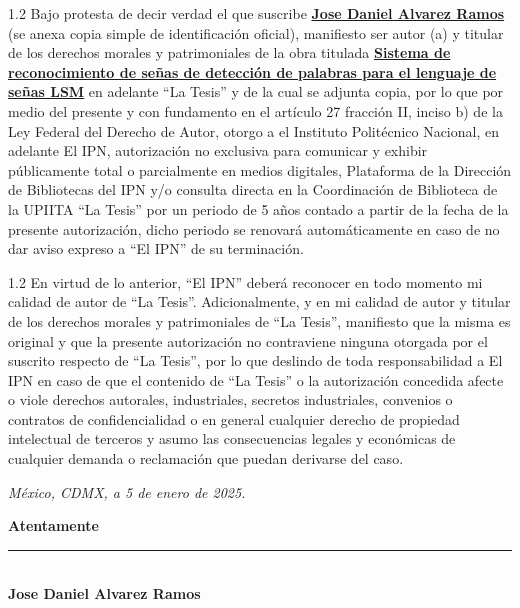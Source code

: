 \begin{spacing}{1.2}
    \noindent Bajo protesta de decir verdad el que suscribe \ul{\textbf{Jose Daniel Alvarez Ramos}} (se anexa copia simple de identificación oficial), manifiesto ser autor (a) y titular de los derechos morales y patrimoniales de la obra titulada \ul{\textbf{Sistema de reconocimiento de señas de detección de palabras
    para el lenguaje de señas LSM}} en adelante ``La Tesis'' y de la cual se adjunta copia, por lo que por medio del presente y con fundamento en el artículo 27 fracción II, inciso b) de la Ley Federal del Derecho de Autor, otorgo a el Instituto Politécnico Nacional, en adelante El IPN, autorización no exclusiva para comunicar y exhibir públicamente total o parcialmente en medios digitales, Plataforma de la Dirección de Bibliotecas del IPN y/o consulta directa en la Coordinación de Biblioteca de la UPIITA ``La Tesis'' por un periodo de 5 años contado a partir de la fecha de la presente autorización, dicho periodo se renovará automáticamente en caso de no dar aviso expreso a ``El IPN'' de su terminación.
\end{spacing}

\vspace{0.6cm}
\begin{spacing}{1.2}
\noindent En virtud de lo anterior, ``El IPN'' deberá reconocer en todo momento mi calidad de autor de ``La Tesis''. Adicionalmente, y en mi calidad de autor y titular de los derechos morales y patrimoniales de ``La Tesis'', manifiesto que la misma es original y que la presente autorización no contraviene ninguna otorgada por el suscrito respecto de ``La Tesis'', por lo que deslindo de toda responsabilidad a El IPN en caso de que el contenido de ``La Tesis'' o la autorización concedida afecte o viole derechos autorales, industriales, secretos industriales, convenios o contratos de confidencialidad o en general cualquier derecho de propiedad intelectual de terceros y asumo las consecuencias legales y económicas de cualquier demanda o reclamación que puedan derivarse del caso.
\end{spacing}
\vspace{0.5cm}

\begin{center}
    \textit{México, CDMX, a 5 de enero de 2025.}
\end{center}

\vspace{0.5cm}

\begin{center}
    \textbf{Atentamente}  \\
    \vspace{2.5cm}
    \rule{7cm}{0.4pt} \\
    \textbf{Jose Daniel Alvarez Ramos}
\end{center}